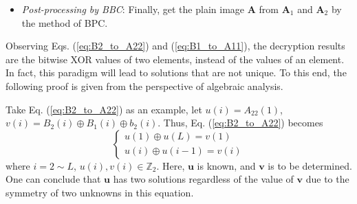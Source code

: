 \documentclass[final,3p,times,twocolumn]{elsarticle}
\begin{document}
\begin{itemize}
	Step 3. Recover $\bm{A}_{11}$ by performing the bitwise XOR operations between $\bm{B}_{1}$, $\bm{A}_{2}$ and $\bm{b}_{1}$, given as
	\begin{equation}
	\left\{ \begin{array}{l}
	A_{11}(1) \oplus A_{11}(L) = B_1(1) \oplus A_{2}(1) \oplus b_{1}(1)\\
	A_{11}(i) \oplus A_{11}(i-1) B_1(i) \oplus A_{2}(i) \oplus b_{1}(i)
	\end{array} \right.
	\label{eq:B1_to_A11}
	\end{equation}
	where $i=2 \sim L$.
	
	Step 4. Obtain $sum_1$ by Eq. (\ref{eq:sum1}), and then get $\bm{A}_{1}$ by doing cyclic left shift operation on $\bm{A}_{11}$ with $sum_1$ bits.
	
	\item \emph{Post-processing by BBC}:
	Finally, get the plain image $\bm{A}$ from $\bm{A}_1$ and $\bm{A}_2$ by the method of BPC.
\end{itemize}

Observing Eqs. (\ref{eq:B2_to_A22}) and (\ref{eq:B1_to_A11}), the decryption results are the bitwise XOR values of two elements, instead of the values of an element. In fact, this paradigm will lead to solutions that are not unique. To this end, the following proof is given from the perspective of algebraic analysis. 

%


Take Eq. (\ref{eq:B2_to_A22}) as an example, let $u(i)=A_{22}(1)$, $v(i)=B_2(i) \oplus B_{1}(i) \oplus b_{2}(i)$. Thus, Eq. (\ref{eq:B2_to_A22}) becomes
\begin{equation}
\left\{ \begin{array}{l}
u(1) \oplus u(L)  = v(1)\\
u(i) \oplus u(i-1) = v(i)
\end{array} \right.
\label{eq:two_solutions}
\end{equation}
where $i=2 \sim L$, $u(i),v(i) \in \mathbb{Z}_{2}$. Here, $\bm{u}$ is known, and $\bm{v}$ is to be determined.
One can conclude that $\bm{u}$ has two solutions regardless of the value of $\bm{v}$ due to the symmetry of two unknowns in this equation.
\end{document}
